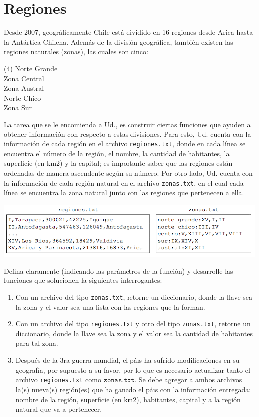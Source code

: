 \section{Regiones}

Desde 2007, geográficamente Chile está dividido en 16 regiones desde Arica hasta la Antártica Chilena. Además de la división geográfica, también existen las regiones naturales (zonas), las cuales son cinco:

\begin{tasks}[label =$\bullet$](4)
    \task Norte Grande \\
    \task Zona Central \\
    \task Zona Austral \\
    \task Norte Chico \\
    \task Zona Sur
\end{tasks}

La tarea que se le encomienda a Ud., es construir ciertas funciones que ayuden a obtener información con respecto a estas divisiones. Para esto, Ud. cuenta con la información de cada región en el archivo \texttt{regiones.txt}, donde en cada línea se encuentra el número de la región, el nombre, la cantidad de habitantes, la superficie (en km2) y la capital; es importante saber que las regiones están ordenadas de manera ascendente según su número. Por otro lado, Ud. cuenta con la información de cada región natural en el archivo \texttt{zonas.txt}, en el cual cada línea se encuentra la zona natural junto con las regiones que pertenecen a ella.

%
\includegraphics[width=15cm]{Images/f1.png}

Defina claramente (indicando las parámetros de la función) y desarrolle las funciones que solucionen la siguientes interrogantes:
\begin{enumerate}[label=\alph*)]
    \item Con un archivo del tipo \texttt{zonas.txt}, retorne un diccionario, donde la llave sea la zona y el valor sea una lista con las regiones que la forman.
    \item Con un archivo del tipo \texttt{regiones.txt} y otro del tipo \texttt{zonas.txt}, retorne un diccionario, donde la llave sea la zona y el valor sea la cantidad de habitantes para tal zona.
    \item Después de la 3ra guerra mundial, el páıs ha sufrido modificaciones en su geografía, por supuesto a su favor, por lo que es necesario actualizar tanto el archivo \texttt{regiones.txt} como $\texttt{zonas.txt}$. Se debe agregar a ambos archivos la(s) nueva(s) región(es) que ha ganado el páıs con la información entregada: nombre de la región, superficie (en km2), habitantes, capital y a la región natural que va a pertenecer.
\end{enumerate}

